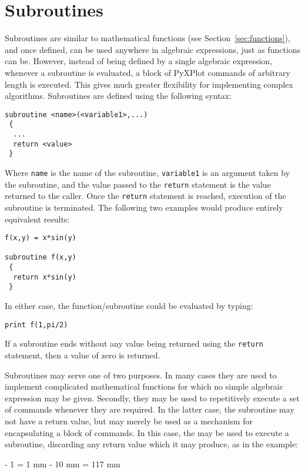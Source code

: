 \section{Subroutines}
\label{sec:subroutines}

Subroutines are similar to mathematical functions (see
Section~\ref{sec:functions}), and once defined, can be used anywhere in
algebraic expressions, just as functions can be.  However, instead of being
defined by a single algebraic expression, whenever a subroutine is evaluated, a
block of PyXPlot commands of arbitrary length is executed. This gives much
greater flexibility for implementing complex algorithms. Subroutines are
defined using the following syntax:
\begin{verbatim}
subroutine <name>(<variable1>,...)
 {
  ...
  return <value>
 }
\end{verbatim}
Where {\tt name} is the name of the subroutine, {\tt variable1} is an argument
taken by the subroutine, and the value passed to the {\tt return} statement is
the value returned to the caller. Once the {\tt return} statement is reached,
execution of the subroutine is terminated. The following two examples would
produce entirely equivalent results:
\begin{verbatim}
f(x,y) = x*sin(y)

subroutine f(x,y)
 {
  return x*sin(y)
 }
\end{verbatim}
In either case, the function/subroutine could be evaluated by typing:
\begin{verbatim}
print f(1,pi/2)
\end{verbatim}
If a subroutine ends without any value being returned using the {\tt return}
statement, then a value of zero is returned.

Subroutines may serve one of two purposes. In many cases they are used to
implement complicated mathematical functions for which no simple algebraic
expression may be given. Secondly, they may be used to repetitively execute a
set of commands whenever they are required. In the latter case, the subroutine
may not have a return value, but may merely be used as a mechanism for
encapsulating a block of commands.  In this case, the  may be
used to execute a subroutine, discarding any return value which it may produce,
as in the example:

\vspace{3mm}
\newline
{}\newline
{}\newline
{}
\vspace{3mm}\newline
{} - 1 = 1
 mm - 10 mm = 117 mm
\vspace{3mm}


